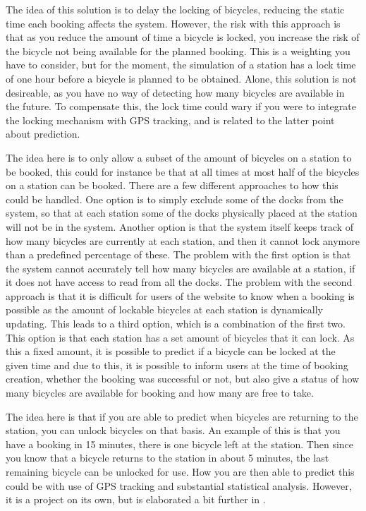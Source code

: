 \begin{description}[style=nextline]
		\item[Lock late]
		The idea of this solution is to delay the locking of bicycles, reducing the static time each booking affects the system.
		However, the risk with this approach is that as you reduce the amount of time a bicycle is locked, you increase the risk of the bicycle not being available for the planned booking.
		This is a weighting you have to consider, but for the moment, the simulation of a station has a lock time of one hour before a bicycle is planned to be obtained.
		Alone, this solution is not desireable, as you have no way of detecting how many bicycles are available in the future.
		To compensate this, the lock time could wary if you were to integrate the locking mechanism with GPS tracking, and is related to the latter point about prediction.
		
		\item[Subset of bicycles for booking]
		The idea here is to only allow a subset of the amount of bicycles on a station to be booked, this could for instance be that at all times at most half of the bicycles on a station can be booked.
		There are a few different approaches to how this could be handled.
		One option is to simply exclude some of the docks from the system, so that at each station some of the docks physically placed at the station will not be in the system.
		Another option is that the system itself keeps track of how many bicycles are currently at each station, and then it cannot lock anymore than a predefined percentage of these.
		The problem with the first option is that the system cannot accurately tell how many bicycles are available at a station, if it does not have access to read from all the docks.
		The problem with the second approach is that it is difficult for users of the website to know when a booking is possible as the amount of lockable bicycles at each station is dynamically updating.
		This leads to a third option, which is a combination of the first two.
		This option is that each station has a set amount of bicycles that it can lock.
		As this a fixed amount, it is possible to predict if a bicycle can be locked at the given time and due to this, it is possible to inform users at the time of booking creation, whether the booking was successful or not, but also give a status of how many bicycles are available for booking and how many are free to take.
		
		\item[Prediction]
		The idea here is that if you are able to predict when bicycles are returning to the station, you can unlock bicycles on that basis.
		An example of this is that you have a booking in 15 minutes, there is one bicycle left at the station. Then since you know that a bicycle returns to the station in about 5 minutes, the last remaining bicycle can be unlocked for use.
		How you are then able to predict this could be with use of GPS tracking and substantial statistical analysis.
		However, it is a project on its own, but is elaborated a bit further in .
\end{description}

